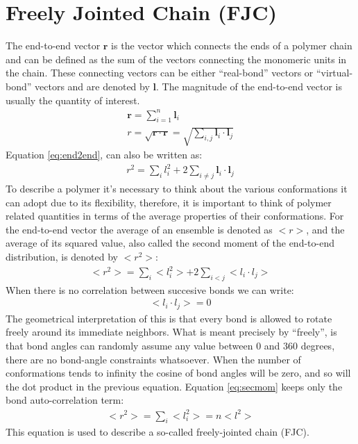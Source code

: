 \section{Freely Jointed Chain (FJC)}
The end-to-end  vector $\mathbf{r}$ is  the vector which  connects the
ends of a polymer  chain and can be defined as the  sum of the vectors
connecting the monomeric units  in the chain. These connecting vectors
can be  either ``real-bond''  vectors or ``virtual-bond''  vectors and
are denoted  by $\mathbf{l}$.  The magnitude of  the end-to-end vector
is usually the quantity of interest.
\begin{gather}
\mathbf{r} = \sum_{i=1}^{n} \mathbf{l}_{i}\\
\label{eq:end2end}
r = \sqrt{\mathbf{r} \cdot \mathbf{r}}
  = \sqrt{\sum_{i,j}\mathbf{l}_{i} \cdot \mathbf{l}_{j}}
\end{gather}
Equation \ref{eq:end2end}, can also be written as:
\begin{gather}
r^2 = \sum_{i}l_{i}^{2} + 2 \sum_{i\neq j} \mathbf{l}_{i} \cdot \mathbf{l}_{j}
\end{gather}  
To  describe a  polymer  it's  necessary to  think  about the  various
conformations it  can adopt due  to its flexibility, therefore,  it is
important  to think  of polymer  related  quantities in  terms of  the
average properties of their conformations. For the end-to-end vector the
average of an ensemble is denoted  as $<r>$, and  the average  of its
squared  value,  also  called  the  second moment  of  the  end-to-end
distribution, is denoted by $<r^2>$:
\begin{gather}
\label{eq:secmom}  
<r^2>=\sum_{i}<l_{i}^2> + 2\sum_{i<j}<l_{i} \cdot l_{j}>
\end{gather}  
When there is no correlation between succesive bonds we can write:
\begin{gather}
\label{eq:nocorr}
<l_{i} \cdot l_{j}> = 0
\end{gather}
The geometrical interpretation  of this is that every  bond is allowed
to  rotate  freely  around  its  immediate neighbors.  What  is  meant
precisely by  ``freely'', is that  bond angles can randomly  assume any
value between 0  and 360 degrees, there are  no bond-angle constraints
whatsoever.  When the number  of conformations  tends to  infinity the
cosine of bond angles will be zero, and so will the dot product in the
previous equation.
Equation \ref{eq:secmom} keeps only the bond auto-correlation term:
\begin{gather}
<r^2> = \sum_{i}<l_{i}^2> = n<l^2>
\end{gather}  
This equation is used to describe a so-called freely-jointed chain
(FJC). 
